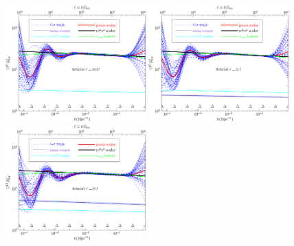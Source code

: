 \documentclass[a4paper,11pt]{article}
\def \halffigwidth{0.48\textwidth}
\begin{document}
\begin{figure}
  \includegraphics[width=\halffigwidth]{nobicep_spline0_p11_r0d02_power_traj.pdf}%
  \includegraphics[width=\halffigwidth]{nobicep_spline0_p11_r0d1_power_traj.pdf}
  \includegraphics[width=\halffigwidth]{nobicep_spline0_p11_r0d2_power_traj.pdf}%

\end{figure}
\end{document}
